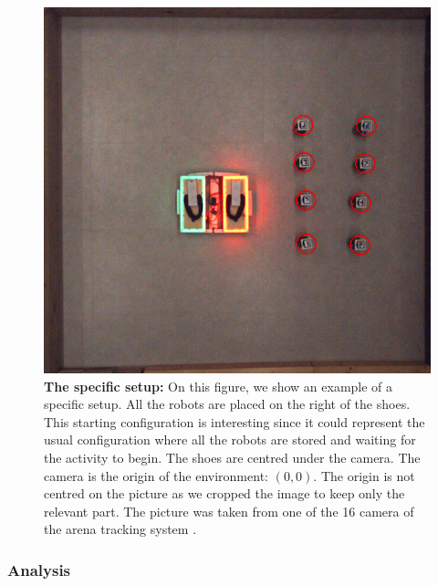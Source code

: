 \documentclass[oneside, a4paper, 12pt]{memoir}
\let\oldCaption\caption
\renewcommand{\caption}[2]{
\oldCaption[#1]{{\small\sffamily\bfseries #1:} #2}
}
\begin{document}
				\begin{figure}[!htp]
					\includegraphics[width=\textwidth]{images/setup_geo.png}
					\caption{The specific setup}{On this figure, we show an example of a specific setup. All the robots are placed on the right of the shoes. This starting configuration is interesting since it could represent the usual configuration where all the robots are stored and waiting for the activity to begin. The shoes are centred under the camera. The camera is the origin of the environment: $(0,0)$. The origin is not centred on the picture as we cropped the image to keep only the relevant part. The picture was taken from one of the 16 camera of the arena tracking system \citep{stranieri2013iridia}.}
					\label{fig:geo_setup}
				\end{figure}
			
			\subsubsection{Analysis}
			

					
					
			
\end{document}
